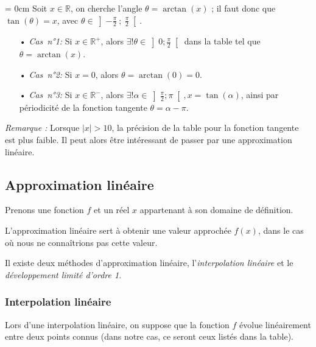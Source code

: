\documentclass[a4paper]{article}
\begin{document}
					\vspace{2 mm}

					{\parindent = 0cm Soit $x \in \mathbb{R}$, on cherche l'angle $\theta = \arctan(x)$ ; il faut donc que $\tan(\theta) = x$, 
					avec $\theta \in \left]-\frac{\pi}{2}~;~\frac{\pi}{2}\right[$.}

					\vspace{2 mm}

					\begin{itemize}
						\item [•] \emph{Cas~n°1:} Si $x \in \mathbb{R}^+$, alors $\exists! \theta \in \left]0;\frac{\pi}{2}\right[$ dans la table tel que $\theta = \arctan(x)$.
						\vspace{2 mm}
						\item [•] \emph{Cas~n°2:} Si $x = 0$, alors $\theta = \arctan(0) = 0$.
						\vspace{2 mm}
						\item [•] \emph{Cas~n°3:} Si $x \in \mathbb{R}^-$, alors $\exists! \alpha \in \left]\frac{\pi}{2};\pi\right[, x = \tan(\alpha)$, ainsi par périodicité de la fonction tangente $\theta = \alpha - \pi$.
					\end{itemize}

					\vspace{2 mm}

					\emph{Remarque :} Lorsque $|x| > 10$, la précision de la table pour la fonction tangente est plus faible. 
					Il peut alors être intéressant de passer par une approximation linéaire.
		
		\subsection{Approximation linéaire}
			
			Prenons une fonction $f$ et un réel $x$ appartenant à son domaine de définition.

			L'approximation linéaire sert à obtenir une valeur approchée $f(x)$,
			dans le cas où nous ne connaîtrions pas cette valeur.

			Il existe deux méthodes d'approximation linéaire, l'\emph{interpolation linéaire} et le \emph{développement limité d'ordre 1}.

			\subsubsection{Interpolation linéaire}
				
				Lors d'une interpolation linéaire, on suppose que la fonction $f$ évolue linéairement entre deux points connus 
				(dans notre cas, ce seront ceux listés dans la table).  
				
\end{document}
